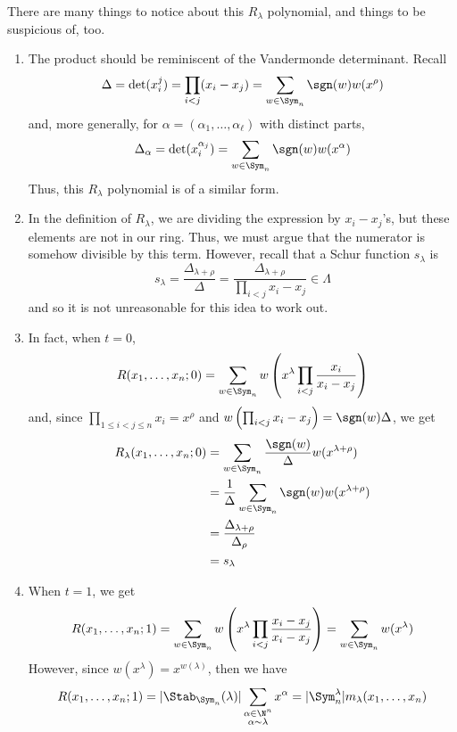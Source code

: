 \documentclass[11pt,leqno,oneside]{amsart}
\numberwithin{thm}{section}
\newcommand{\Vdet}{\Delta}
\newcommand{\rowshift}{\rho}
\newcommand{\sym}{\Lambda}
\begin{document}
\begin{rmk}
  There are many things to notice about this \(R_\lambda\) polynomial,
  and things to be suspicious of, too.
  \begin{enumerate}
  \item The product should be reminiscent of the Vandermonde
    determinant. Recall \[
      \Vdet = \det(x_i^j) = \prod_{i < j} (x_i - x_j) = \sum_{w \in
        \Sym_n} \sgn(w) w(x^\rowshift)
    \]
    and, more generally, for \(\alpha = (\alpha_1, \ldots,
    \alpha_\ell)\) with distinct parts, \[
      \Vdet_{\alpha} = \det(x_i^{\alpha_j}) = \sum_{w \in \Sym_n}
      \sgn(w)w(x^{\alpha}) 
    \]
    Thus, this \(R_\lambda\)  polynomial is of a similar form.
  \item In the definition of \(R_\lambda\), we are dividing the
    expression by \(x_i-x_j\)'s, but these elements are not in our
    ring. Thus, we must argue that the numerator is somehow divisible
    by this term. However, recall that a Schur function \(s_\lambda\) is \[
      s_\lambda = \frac{\Vdet_{\lambda+\rowshift}}{\Vdet} =
      \frac{\Vdet_{\lambda+\rowshift}}{\prod_{i<j} x_i - x_j} \in \sym
    \]
    and so it is not unreasonable for this idea to work out.
  \item In fact, when \(t=0\), \[
      R(x_1, \ldots, x_n;0) = \sum_{w \in \Sym_n} w\left( x^\lambda
        \prod_{i < j} \frac{x_i}{x_i-x_j} \right)
    \]
    and, since \(\prod_{1 \leq i < j \leq n} x_i = x^\rowshift\) and
    \(w\left( \prod_{i < j} x_i - x_j \right) = \sgn(w)\Vdet\), we get
    \begin{align*}
      R_\lambda(x_1, \ldots, x_n;0)
      & = \sum_{w \in \Sym_n} \frac{\sgn(w)}{\Vdet}
        w(x^{\lambda+\rowshift}) \\
      & = \frac{1}{\Vdet} \sum_{w \in \Sym_n} \sgn(w)
        w(x^{\lambda+\rowshift}) \\
      & = \frac{\Vdet_{\lambda+\rowshift}}{\Vdet_{\rowshift}} \\
      & = s_\lambda
    \end{align*}
  \item When \(t=1\), we get \[
      R(x_1, \ldots, x_n;1) = \sum_{w \in \Sym_n} w \left( x^\lambda
        \prod_{i < j} \frac{x_i-x_j}{x_i-x_j} \right) = \sum_{w \in
        \Sym_n} w(x^\lambda)
    \]
    However, since \(w(x^\lambda) = x^{w(\lambda)}\), then we have \[
      R(x_1, \ldots, x_n;1)  = |\Stab_{\Sym_n}(\lambda)|
      \sum_{\substack{\alpha \in \N^n \\ \alpha \sim \lambda}}  x^\alpha =
    |\Sym_n^\lambda| m_{\lambda}(x_1, \ldots, x_n)
    \]
  \end{enumerate}
\end{rmk}
\end{document}

